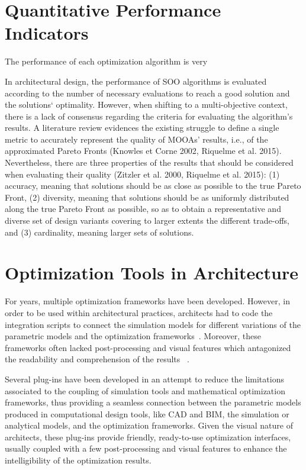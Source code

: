 \section{Quantitative Performance Indicators}
	The performance of each optimization algorithm is very 

	In architectural design, the performance of \ac{SOO} algorithms is evaluated according to the number of necessary evaluations to reach a good solution and the solutions‘ optimality. However, when shifting to a multi-objective context, there is a lack of consensus regarding the criteria for evaluating the algorithm’s results. A literature review evidences the existing struggle to define a single metric to accurately represent the quality of MOOAs’ results, i.e., of
the approximated Pareto Fronts (Knowles et Corne 2002, Riquelme et al. 2015).
Nevertheless, there are three properties of the results that should be considered when evaluating their quality (Zitzler et al. 2000, Riquelme et al. 2015): (1) accuracy, meaning that solutions should be as close as possible to the true Pareto
Front, (2) diversity, meaning that solutions should be as uniformly distributed along the true Pareto Front as possible, so as to obtain a representative and diverse set of design variants covering to larger extents the different trade-offs, and (3) cardinality, meaning larger sets of solutions.

\section{Optimization Tools in Architecture}
	
	For years, multiple optimization frameworks have been developed. However, in order to be used within architectural practices, architects had to code the integration scripts to connect the simulation models for different variations of the parametric models  and the optimization frameworks~\cite{Attia2013}. Moreover, these frameworks often lacked post-processing and visual features which antagonized the readability and comprehension of the results ~\cite{Attia2013,Nguyen2014}.
	
	Several plug-ins have been developed in an attempt to reduce the limitations associated to the coupling of simulation tools and mathematical optimization frameworks, thus providing a seamless connection between the parametric models produced in computational design tools, like \ac{CAD} and \ac{BIM}, the simulation or analytical models, and the optimization frameworks. Given the visual nature of architects, these plug-ins provide friendly, ready-to-use optimization interfaces, usually coupled with a few post-processing and visual features to enhance the intelligibility of the optimization results. 
	
